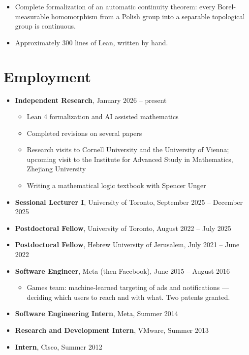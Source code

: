 \documentclass[letterpaper]{article}
\begin{document}
\begin{itemize}
  \item Complete formalization of an automatic continuity theorem:
        every Borel-measurable homomorphism from a Polish group into a
        separable topological group is continuous.
  \item Approximately 300 lines of Lean, written by hand.
\end{itemize}

\section*{Employment}

\begin{itemize}
  \item \textbf{Independent Research}, January 2026 -- present
  \begin{itemize}
    \item Lean 4 formalization and AI assisted mathematics
    \item Completed revisions on several papers
    \item Research visits to Cornell University and the University of Vienna;
          upcoming visit to the Institute for Advanced Study in Mathematics,
          Zhejiang University
    \item Writing a mathematical logic textbook with Spencer Unger
  \end{itemize}

  \item \textbf{Sessional Lecturer I}, University of Toronto,
        September 2025 -- December 2025

  \item \textbf{Postdoctoral Fellow}, University of Toronto,
        August 2022 -- July 2025

  \item \textbf{Postdoctoral Fellow}, Hebrew University of Jerusalem,
        July 2021 -- June 2022

  \item \textbf{Software Engineer}, Meta (then Facebook),
        June 2015 -- August 2016
  \begin{itemize}
    \item Games team: machine-learned targeting of ads and notifications ---
          deciding which users to reach and with what. Two patents granted.
  \end{itemize}

  \item \textbf{Software Engineering Intern}, Meta, Summer 2014
  \item \textbf{Research and Development Intern}, VMware, Summer 2013
  \item \textbf{Intern}, Cisco, Summer 2012
\end{itemize}
\end{document}

